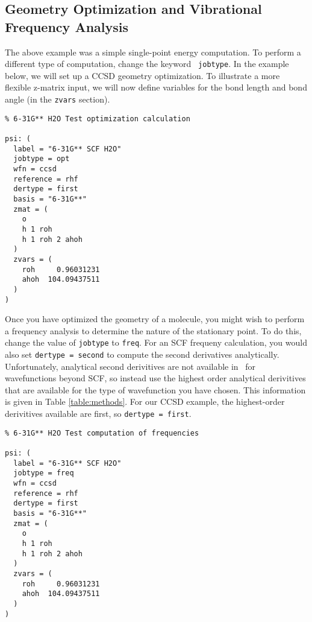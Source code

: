 \subsection{Geometry Optimization and Vibrational Frequency Analysis}
The above example was a simple single-point energy computation.
To perform a different type of computation, change the keyword {\tt
jobtype}.  In the example below, we will set up
a CCSD geometry optimization.  To illustrate a more flexible z-matrix
input, we will now define variables for the bond length and bond angle
(in the {\tt zvars} section).

\begin{verbatim}
% 6-31G** H2O Test optimization calculation

psi: (
  label = "6-31G** SCF H2O"
  jobtype = opt
  wfn = ccsd
  reference = rhf
  dertype = first
  basis = "6-31G**"
  zmat = (
    o
    h 1 roh
    h 1 roh 2 ahoh
  )
  zvars = (
    roh     0.96031231
    ahoh  104.09437511
  )
)
\end{verbatim}

Once you have optimized the geometry of a molecule, you might wish to
perform a frequency analysis to determine the nature of the stationary
point.  To do this, change the value of {\tt jobtype} to {\tt freq}.
For an SCF frequeny calculation, you would also set {\tt dertype =
second} to compute the second derivatives analytically.  Unfortunately,
analytical second derivitives are not available in \PSIfour\ for
wavefunctions beyond SCF, so instead use the highest order analytical
derivitives that are available for the type of wavefunction you
have chosen.  This information is given in Table \ref{table:methods}.
For our CCSD example, the highest-order derivitives available are first,
so {\tt dertype = first}.

\begin{verbatim}
% 6-31G** H2O Test computation of frequencies

psi: (
  label = "6-31G** SCF H2O"
  jobtype = freq
  wfn = ccsd
  reference = rhf
  dertype = first
  basis = "6-31G**"
  zmat = (
    o
    h 1 roh
    h 1 roh 2 ahoh
  )
  zvars = (
    roh     0.96031231
    ahoh  104.09437511
  )
)
\end{verbatim}

